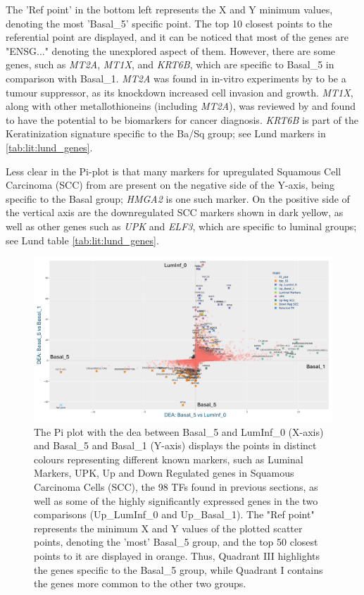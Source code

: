 The 'Ref point' in the bottom left represents the X and Y minimum values, denoting the most 'Basal\_5' specific point. The top 10 closest points to the referential point are displayed, and it can be noticed that most of the genes are "ENSG..." denoting the unexplored aspect of them. However, there are some genes, such as \textit{MT2A}, \textit{MT1X}, and \textit{KRT6B}, which are specific to Basal\_5 in comparison with Basal\_1. \textit{MT2A} was found in in-vitro experiments by \citep{Sung2022-tm} to be a tumour suppressor, as its knockdown increased cell invasion and growth. \textit{MT1X}, along with other metallothioneins (including \textit{MT2A}), was reviewed by \citep{Si2018-ep} and found to have the potential to be biomarkers for cancer diagnosis. \textit{KRT6B} is part of the Keratinization signature specific to the Ba/Sq group; see Lund markers in \cref{tab:lit:lund_genes}.

Less clear in the Pi-plot is that many markers for upregulated Squamous Cell Carcinoma (SCC) from \citep{Hurst2022-sp} are present on the negative side of the Y-axis, being specific to the Basal group; \textit{HMGA2} is one such marker. On the positive side of the vertical axis are the downregulated SCC markers shown in dark yellow, as well as other genes such as \textit{UPK} and \textit{ELF3}, which are specific to luminal groups; see Lund table \cref{tab:lit:lund_genes}.

\begin{figure}
    \centering
    \includegraphics[width=1.0\textwidth,height=1.0\textheight,keepaspectratio]{Sections/Network_II/resources/reward/PI_Basal_5.png}
    \caption{The Pi plot with the \acrfull{dea} between Basal\_5 and LumInf\_0 (X-axis) and Basal\_5 and Basal\_1 (Y-axis) displays the points in distinct colours representing different known markers, such as Luminal Markers, UPK, Up and Down Regulated genes in Squamous Carcinoma Cells (SCC), the 98 TFs found in previous sections, as well as some of the highly significantly expressed genes in the two comparisons (Up\_LumInf\_0 and Up\_Basal\_1). The "Ref point" represents the minimum X and Y values of the plotted scatter points, denoting the 'most' Basal\_5 group, and the top 50 closest points to it are displayed in orange. Thus, Quadrant III highlights the genes specific to the Basal\_5 group, while Quadrant I contains the genes more common to the other two groups.}
    \label{fig:N_II:pi_basal_5}
\end{figure}


